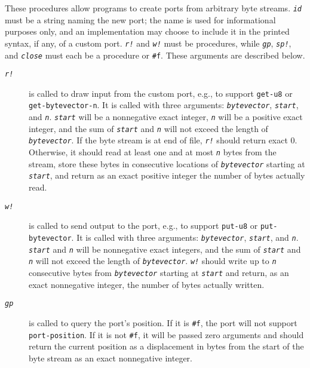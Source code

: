 These procedures allow programs to create ports from arbitrary byte streams.
\texttt{\textit{id}} must be a string naming the new port; the name is used for informational
purposes only, and an implementation may choose to include it in the printed
syntax, if any, of a custom port.
\texttt{\textit{r!}} and \texttt{\textit{w!}} must be procedures, while \texttt{\textit{gp}}, \texttt{\textit{sp!}}, and
\texttt{\textit{close}} must each be a procedure or \texttt{\#{}f}.
These arguments are described below.

\begin{description}
\item[\texttt{\textit{r!}}]  is called to draw input from the custom port, e.g., to support
\texttt{get-u8} or \texttt{get-bytevector-n}.
It is called with three arguments: \texttt{\textit{bytevector}}, \texttt{\textit{start}}, and \texttt{\textit{n}}.
\texttt{\textit{start}} will be a nonnegative exact integer, \texttt{\textit{n}} will be a
positive exact integer, and the sum of \texttt{\textit{start}} and \texttt{\textit{n}} will
not exceed the length of \texttt{\textit{bytevector}}.
If the byte stream is at end of file, \texttt{\textit{r!}} should return exact 0.
Otherwise, it should read at least one and at most \texttt{\textit{n}} bytes from
the stream, store these bytes in consecutive locations of \texttt{\textit{bytevector}}
starting at \texttt{\textit{start}}, and return as an exact positive integer the
number of bytes actually read.

\item[\texttt{\textit{w!}}]  is called to send output to the port, e.g., to support
\texttt{put-u8} or \texttt{put-bytevector}.
It is called with three arguments: \texttt{\textit{bytevector}}, \texttt{\textit{start}}, and \texttt{\textit{n}}.
\texttt{\textit{start}} and \texttt{\textit{n}} will be nonnegative exact integers, and the
sum of \texttt{\textit{start}} and \texttt{\textit{n}} will not exceed the length of
\texttt{\textit{bytevector}}.
\texttt{\textit{w!}} should write up to \texttt{\textit{n}} consecutive bytes from
\texttt{\textit{bytevector}} starting at \texttt{\textit{start}} and return, as an exact nonnegative
integer, the number of bytes actually written.

\item[\texttt{\textit{gp}}]  is called to query the port's position.
If it is \texttt{\#{}f}, the port will not support \texttt{port-position}.
If it is not \texttt{\#{}f}, it will be passed zero arguments and should
return the current position as a displacement in bytes from the start
of the byte stream as an exact nonnegative integer.


\end{description}
